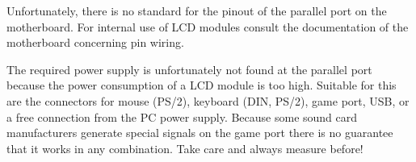   Unfortunately, there is no standard for the pinout of the parallel port
  on the motherboard. For internal use of LCD modules consult the documentation
  of the motherboard concerning pin wiring.

  The required power supply is unfortunately not found at the parallel port because
  the power consumption of a LCD module is too high. Suitable for this are the connectors
  for mouse (PS/2), keyboard (DIN, PS/2), game port, USB, or a free connection from the
  PC power supply. Because some sound card manufacturers generate special signals 
  on the game port there is no guarantee that it works in any combination. 
  Take care and always measure before!
